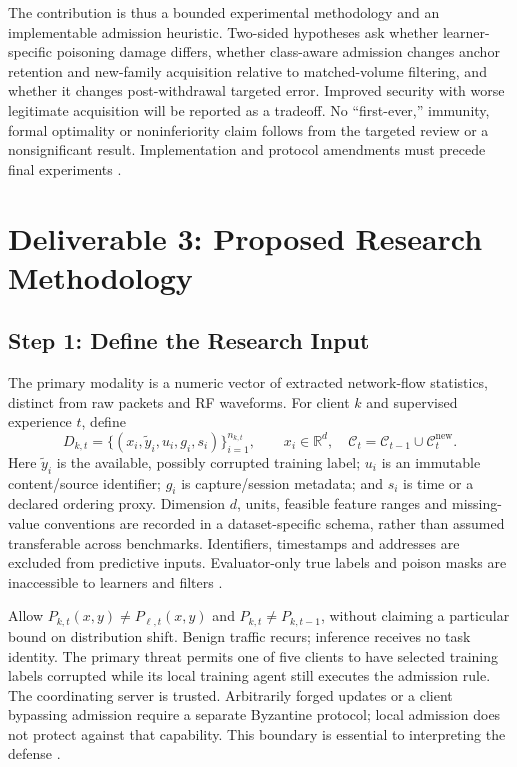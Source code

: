 \documentclass[10pt,a4paper]{article}
\begin{document}
The contribution is thus a bounded experimental methodology and an implementable admission heuristic. Two-sided hypotheses ask whether learner-specific poisoning damage differs, whether class-aware admission changes anchor retention and new-family acquisition relative to matched-volume filtering, and whether it changes post-withdrawal targeted error. Improved security with worse legitimate acquisition will be reported as a tradeoff. No ``first-ever,'' immunity, formal optimality or noninferiority claim follows from the targeted review or a nonsignificant result. Implementation and protocol amendments must precede final experiments \cite{repo}.

\section{Deliverable 3: Proposed Research Methodology}
\subsection{Step 1: Define the Research Input}
The primary modality is a numeric vector of extracted network-flow statistics, distinct from raw packets and RF waveforms. For client $k$ and supervised experience $t$, define
\begin{equation}
D_{k,t}=\{(x_i,\widetilde y_i,u_i,g_i,s_i)\}_{i=1}^{n_{k,t}},\qquad x_i\in\mathbb R^d,
\quad \mathcal C_t=\mathcal C_{t-1}\cup\mathcal C_t^{\mathrm{new}}.
\end{equation}
Here $\widetilde y_i$ is the available, possibly corrupted training label; $u_i$ is an immutable content/source identifier; $g_i$ is capture/session metadata; and $s_i$ is time or a declared ordering proxy. Dimension $d$, units, feasible feature ranges and missing-value conventions are recorded in a dataset-specific schema, rather than assumed transferable across benchmarks. Identifiers, timestamps and addresses are excluded from predictive inputs. Evaluator-only true labels and poison masks are inaccessible to learners and filters \cite{repo,lavaur}.

Allow $P_{k,t}(x,y)\ne P_{\ell,t}(x,y)$ and $P_{k,t}\ne P_{k,t-1}$, without claiming a particular bound on distribution shift. Benign traffic recurs; inference receives no task identity. The primary threat permits one of five clients to have selected training labels corrupted while its local training agent still executes the admission rule. The coordinating server is trusted. Arbitrarily forged updates or a client bypassing admission require a separate Byzantine protocol; local admission does not protect against that capability. This boundary is essential to interpreting the defense \cite{lavaur,wei,repo}.
\end{document}
